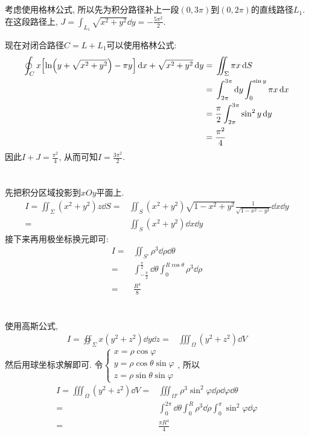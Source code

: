 \documentclass[12pt]{ctexart}
\begin{document}
\section{}
考虑使用格林公式, 所以先为积分路径补上一段$(0,3\pi)$到$(0,2\pi)$的直线路径$L_1$. 在这段路径上, $J=\int_{L_1}\sqrt{x^{2}+y^{2}}\dd{y}=-\frac{5\pi^{2}}{2}$.\par
现在对闭合路径$C=L+L_1$可以使用格林公式:
\begin{align*}
	\oint_{C}x\qty[\ln(y+\sqrt{x^{2}+y^{2}})-\pi y]\dd{x}+\sqrt{x^{2}+y^{2}}\dd{y}={}&\iint_{\Sigma}\pi x\dd{S}\\
	={}&\int_{2\pi}^{3\pi}\dd{y}\int_{0}^{\sin{y}}\pi x\dd{x}\\
	={}&\frac{\pi}{2}\int_{2\pi}^{3\pi}\sin^{2}{y}\dd{y}\\
	={}&\frac{\pi^{2}}{4}
\end{align*}
因此$I+J=\frac{\pi^{2}}{4}$, 从而可知$I=\frac{3\pi^{2}}{2}$.\par
\section{}
先把积分区域投影到$xOy$平面上.
\begin{align*}
	I=\iint_{\Sigma}(x^{2}+y^{2})z\dd{S}={}&\iint_{S}(x^{2}+y^{2})\sqrt{1-x^2+y^2}\frac{1}{\sqrt{1-x^2-y^2}}\dd{x}\dd{y}\\
	={}&\iint_{S}(x^{2}+y^{2})\dd{x}\dd{y}
\end{align*}
接下来再用极坐标换元即可:
\begin{align*}
	I={}&\iint_{S'}\rho^{3}\dd{\rho}\dd{\theta}\\
	={}&\int_{-\frac{\pi}{2}}^{\frac{\pi}{2}}\dd{\theta}\int_{0}^{R\cos\theta}\rho^{3}\dd{\rho}\\
	={}&\frac{R^{4}}{8}
\end{align*}
\section{}
使用高斯公式,
\begin{align*}
	I=\oiint_{\Sigma}x(y^{2}+z^{2})\dd{y}\dd{z}={}&\iiint_{\Omega}(y^{2}+z^{2})\dd{V}
\end{align*}
然后用球坐标求解即可. 令$\begin{cases}
	x=\rho\cos\varphi\\
	y=\rho\cos\theta\sin\varphi\\
	z=\rho\sin\theta\sin\varphi
\end{cases}$, 所以
\begin{align*}
	I=\iiint_{\Omega}(y^{2}+z^{2})\dd{V}={}&\iiint_{\Omega'}\rho^{3}\sin^{2}\varphi\dd{\rho}\dd{\varphi}\dd{\theta}\\
	={}&\int_{0}^{2\pi}\dd{\theta}\int_{0}^{R}\rho^{3}\dd{\rho}\int_{0}^{\pi}\sin^{2}{\varphi}\dd{\varphi}\\
	={}&\frac{\pi R^{4}}{4}
\end{align*}
\end{document}
